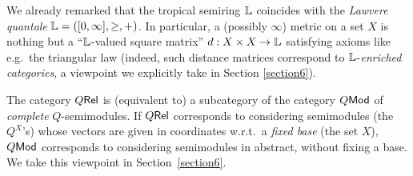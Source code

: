 \documentclass[submission,%
]{eptcs}
\begin{document}
We already remarked that the tropical semiring $\mathbb{L}$ coincides with the \emph{Lawvere quantale} $\mathbb{L}=([0,\infty], \geq, +)$.
In particular, a (possibly $\infty$) metric on a set $X$ is nothing but a ``$\mathbb{L}$-valued square matrix'' $d:X\times X\to \mathbb{L}$ satisfying axioms like e.g.~the triangular law (indeed, such distance matrices correspond to $\mathbb{L}$-\emph{enriched categories}, a viewpoint we explicitly take in Section \ref{section6}). 

\begin{remark}
 The category $Q \mathsf{Rel}$ is (equivalent to) a subcategory of the category $Q\mathsf{Mod}$ of \emph{complete} $Q$-semimodules.
 If $Q \mathsf{Rel}$ corresponds to considering semimodules (the $Q^X$'s) whose vectors are given in coordinates w.r.t.\ a \emph{fixed base} (the set $X$), $Q\mathsf{Mod}$ corresponds to considering semimodules in abstract, without fixing a base.
 We take this viewpoint in Section~\ref{section6}.
\end{remark}


\end{document}
